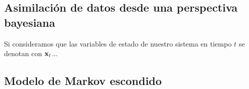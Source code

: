 \subsection{Asimilación de datos desde una perspectiva bayesiana}

Si consideramos que las variables de estado de nuestro sistema en tiempo $t$ se denotan con $\mathbf{x}_t$...

\subsection{Modelo de Markov escondido}
